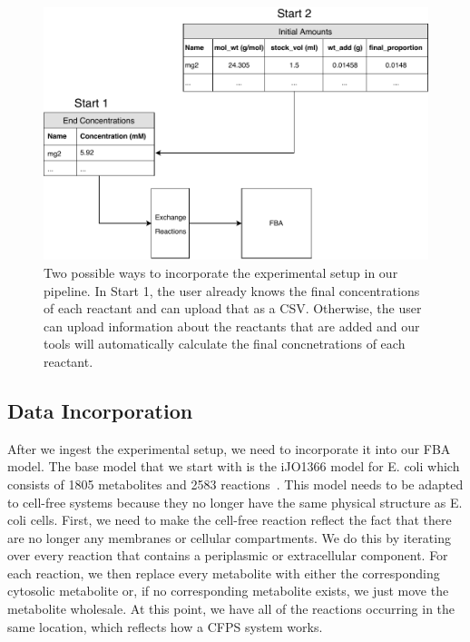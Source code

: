 \begin{figure}[t!]
\begin{center}
\includegraphics{figs/DataIngestion.pdf}
\caption{Two possible ways to incorporate the experimental setup in our pipeline.
In Start 1, the user already knows the final concentrations of each reactant and can upload that as a CSV.
Otherwise, the user can upload information about the reactants that are added and our tools will automatically calculate the final concnetrations of each reactant.}
\end{center}
\label{fig:ingest}
\end{figure}

\subsection{Data Incorporation} \label{sec:incorp}
After we ingest the experimental setup, we need to incorporate it into our FBA model.
The base model that we start with is the iJO1366 model for E. coli which consists of 1805 metabolites and 2583 reactions~\cite{orth2011comprehensive}.
This model needs to be adapted to cell-free systems because they no longer have the same physical structure as E. coli cells.
First, we need to make the cell-free reaction reflect the fact that there are no longer any membranes or cellular compartments.
We do this by iterating over every reaction that contains a periplasmic or extracellular component.
For each reaction, we then replace every metabolite with either the corresponding cytosolic metabolite or, if no corresponding metabolite exists, we just move the metabolite wholesale.
At this point, we have all of the reactions occurring in the same location, which reflects how a CFPS system works.

